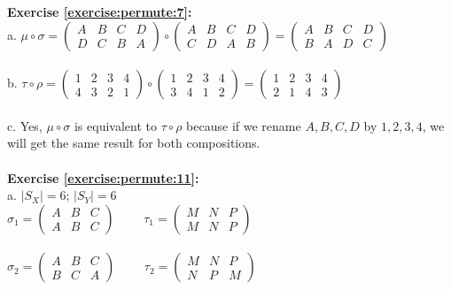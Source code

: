 \textbf{Exercise \ref{exercise:permute:7}:}\\
a. $\mu\circ\sigma=\begin{pmatrix}
A & B & C & D\\
D & C & B & A
\end{pmatrix}\circ\begin{pmatrix}
A & B & C & D\\
C & D & A & B
\end{pmatrix}=\begin{pmatrix}
A & B & C & D\\
B & A & D & C
\end{pmatrix}$\\
\\
b. $\tau\circ\rho=\begin{pmatrix}
1 & 2 & 3 & 4\\
4 & 3 & 2 & 1
\end{pmatrix}\circ\begin{pmatrix}
1 & 2 & 3 & 4\\
3 & 4 & 1 & 2
\end{pmatrix}=\begin{pmatrix}
1 & 2 & 3 & 4\\
2 & 1 & 4 & 3
\end{pmatrix}$\\
\\
c. Yes, $\mu\circ\sigma$ is equivalent to $\tau\circ\rho$ because if we rename $A,B,C,D$ by $1,2,3,4$, we will get the same result for both compositions.\\
\\
\textbf{Exercise \ref{exercise:permute:11}:}\\
a. $|S_X|=6$; $|S_Y|=6$\\
$\sigma_1=\begin{pmatrix}
A & B & C\\
A & B & C
\end{pmatrix}$
$\qquad\tau_1=\begin{pmatrix}
M & N & P\\
M & N & P
\end{pmatrix}$\\
\\
$\sigma_2=\begin{pmatrix}
A & B & C\\
B & C & A
\end{pmatrix}$
$\qquad\tau_2=\begin{pmatrix}
M & N & P\\
N & P & M
\end{pmatrix}$\\
